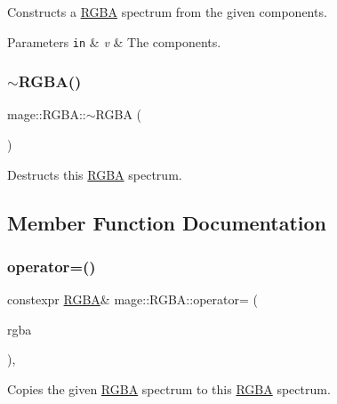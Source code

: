 Constructs a \hyperlink{structmage_1_1_r_g_b_a}{R\+G\+BA} spectrum from the given components.


\begin{DoxyParams}[1]{Parameters}
\mbox{\tt in}  & {\em v} & The components. \\
\hline
\end{DoxyParams}
\hypertarget{structmage_1_1_r_g_b_a_a139a22381a3fb02d1f28be505b41c9df}{}\label{structmage_1_1_r_g_b_a_a139a22381a3fb02d1f28be505b41c9df} 
\subsubsection{\texorpdfstring{$\sim$\+R\+G\+B\+A()}{~RGBA()}}
{\footnotesize\ttfamily mage\+::\+R\+G\+B\+A\+::$\sim$\+R\+G\+BA (\begin{DoxyParamCaption}{ }\end{DoxyParamCaption})\hspace{0.3cm}{\ttfamily [default]}}

Destructs this \hyperlink{structmage_1_1_r_g_b_a}{R\+G\+BA} spectrum. 

\subsection{Member Function Documentation}
\hypertarget{structmage_1_1_r_g_b_a_af8b32f51870ad86f65e5307337b42420}{}\label{structmage_1_1_r_g_b_a_af8b32f51870ad86f65e5307337b42420} 
\subsubsection{\texorpdfstring{operator=()}{operator=()}\hspace{0.1cm}{\footnotesize\ttfamily [1/2]}}
{\footnotesize\ttfamily constexpr \hyperlink{structmage_1_1_r_g_b_a}{R\+G\+BA}\& mage\+::\+R\+G\+B\+A\+::operator= (\begin{DoxyParamCaption}\item[{const \hyperlink{structmage_1_1_r_g_b_a}{R\+G\+BA} \&}]{rgba }\end{DoxyParamCaption})\hspace{0.3cm}{\ttfamily [default]}, {\ttfamily [noexcept]}}

Copies the given \hyperlink{structmage_1_1_r_g_b_a}{R\+G\+BA} spectrum to this \hyperlink{structmage_1_1_r_g_b_a}{R\+G\+BA} spectrum.


